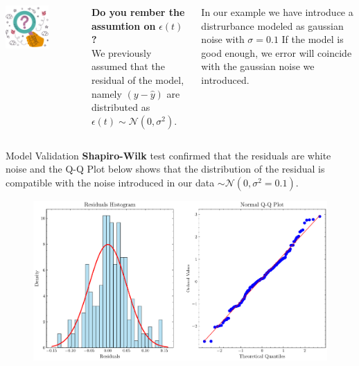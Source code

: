 \documentclass[aspectratio=169,hyperref={pdfpagelabels=false}]{beamer}
\begin{document}
\begin{frame}{}
  \begin{columns}
  \includegraphics[width=0.6\textwidth]{img/pic5.png} \centering
  
    \textbf{Do you rember the assumtion on} $\epsilon(t)$ \textbf{?} \centering \\
    \vspace{2em}
    We previously assumed that the residual of the model, namely $(y - \hat{y})$ 
    are distributed as $\epsilon(t)\sim \mathcal{N}(0,\sigma^2)$.
    \vspace{2em}

    In our example we have introduce a distrurbance modeled as gaussian noise with $\sigma = 0.1$
    If the model is good enough, we error will coincide with the gaussian noise we introduced.
  \end{columns}
\end{frame}

\begin{frame}{Model Validation}
  \textbf{Shapiro-Wilk} test confirmed that the residuals are white noise and the Q-Q Plot below shows that the distribution of the residual is compatible with the noise introduced in our data $\sim \mathcal{N}(0,\sigma^2 = 0.1)$.
  \begin{figure}
    \centering
    \includegraphics[width=0.7\linewidth]{img/residuals_analysis.pdf}
  \end{figure}
\end{frame}
\end{document}
